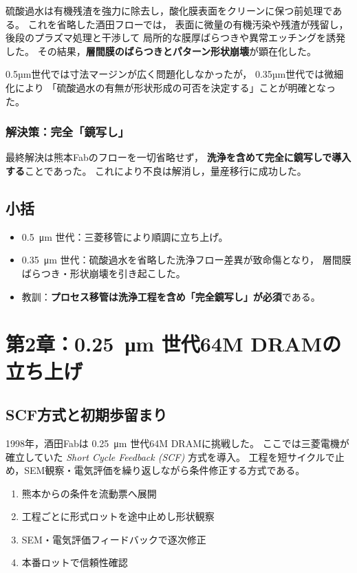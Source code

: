 \documentclass[conference]{IEEEtran}
\let\meter\metre
\begin{document}
硫酸過水は有機残渣を強力に除去し，酸化膜表面をクリーンに保つ前処理である。
これを省略した酒田フローでは，
表面に微量の有機汚染や残渣が残留し，
後段のプラズマ処理と干渉して
局所的な膜厚ばらつきや異常エッチングを誘発した。
その結果，\textbf{層間膜のばらつきとパターン形状崩壊}が顕在化した。

0.5µm世代では寸法マージンが広く問題化しなかったが，
0.35µm世代では微細化により
「硫酸過水の有無が形状形成の可否を決定する」ことが明確となった。

\subsubsection*{解決策：完全「鏡写し」}
最終解決は熊本Fabのフローを一切省略せず，
\textbf{洗浄を含めて完全に鏡写しで導入する}ことであった。
これにより不良は解消し，量産移行に成功した。

\subsection{小括}
\begin{itemize}
  \item \SI{0.5}{\micro\meter} 世代：三菱移管により順調に立ち上げ。
  \item \SI{0.35}{\micro\meter} 世代：硫酸過水を省略した洗浄フロー差異が致命傷となり，
        層間膜ばらつき・形状崩壊を引き起こした。
  \item 教訓：\textbf{プロセス移管は洗浄工程を含め「完全鏡写し」が必須}である。
\end{itemize}

\section{第2章：\texorpdfstring{\SI{0.25}{\micro\meter}}{0.25µm} 世代64M DRAMの立ち上げ}

\subsection{SCF方式と初期歩留まり}
1998年，酒田Fabは \SI{0.25}{\micro\meter} 世代64M DRAMに挑戦した。
ここでは三菱電機が確立していた \emph{Short Cycle Feedback (SCF)} 方式を導入。
工程を短サイクルで止め，SEM観察・電気評価を繰り返しながら条件修正する方式である。

\begin{enumerate}
  \item 熊本からの条件を流動票へ展開
  \item 工程ごとに形式ロットを途中止めし形状観察
  \item SEM・電気評価フィードバックで逐次修正
  \item 本番ロットで信頼性確認
\end{enumerate}
\end{document}
